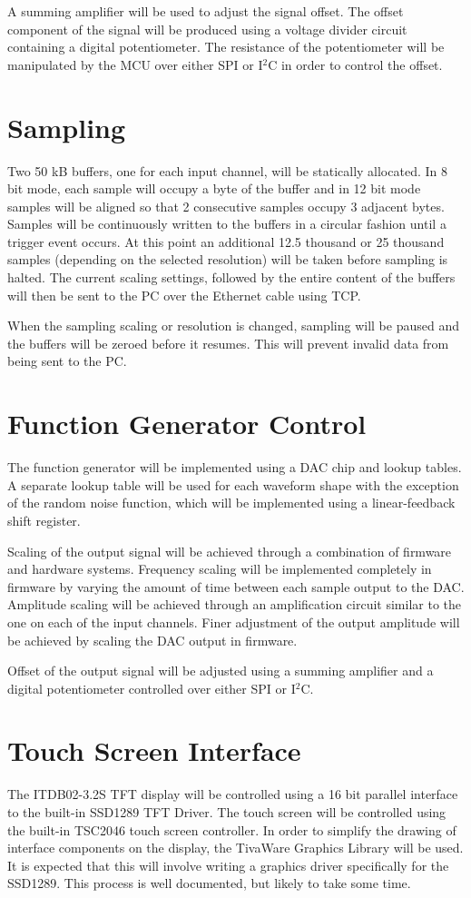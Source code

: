 \documentclass[12pt]{report}
\begin{document}
A summing amplifier will be used to adjust the signal offset. The offset component of the signal will be produced using a voltage divider circuit containing a digital potentiometer. The resistance of the potentiometer will be manipulated by the MCU over either SPI or I$^2$C in order to control the offset.

\section{Sampling}
Two 50 kB buffers, one for each input channel, will be statically allocated. In 8 bit mode, each sample will occupy a byte of the buffer and in 12 bit mode samples will be aligned so that 2 consecutive samples occupy 3 adjacent bytes. Samples will be continuously written to the buffers in a circular fashion until a trigger event occurs. At this point an additional 12.5 thousand or 25 thousand samples (depending on the selected resolution) will be taken before sampling is halted. The current scaling settings, followed by the entire content of the buffers will then be sent to the PC over the Ethernet cable using TCP.

When the sampling scaling or resolution is changed, sampling will be paused and the buffers will be zeroed before it resumes. This will prevent invalid data from being sent to the PC.

\section{Function Generator Control}
The function generator will be implemented using a DAC chip and lookup tables. A separate lookup table will be used for each waveform shape with the exception of the random noise function, which will be implemented using a linear-feedback shift register. 

Scaling of the output signal will be achieved through a combination of firmware and hardware systems. Frequency scaling will be implemented completely in firmware by varying the amount of time between each sample output to the DAC. Amplitude scaling will be achieved through an amplification circuit similar to the one on each of the input channels. Finer adjustment of the output amplitude will be achieved by scaling the DAC output in firmware.

Offset of the output signal will be adjusted using a summing amplifier and a digital potentiometer controlled over either SPI or I$^2$C.

\section{Touch Screen Interface}
The ITDB02-3.2S TFT display will be controlled using a 16 bit parallel interface to the built-in SSD1289 TFT Driver. The touch screen will be controlled using the built-in TSC2046 touch screen controller. In order to simplify the drawing of interface components on the display, the TivaWare Graphics Library will be used. It is expected that this will involve writing a graphics driver specifically for the SSD1289. This process is well documented\cite{TIgrlib}, but likely to take some time.
\end{document}
